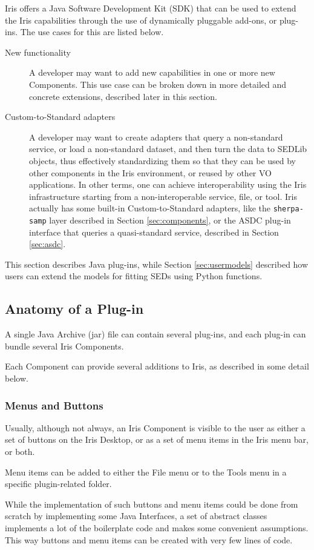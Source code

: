 \documentclass[preprint,authoryear,5p]{elsarticle}
\begin{document}
Iris offers a Java Software Development Kit (SDK) that can be used to extend the Iris
capabilities through the use of dynamically pluggable add-ons, or plug-ins.  The
use cases for this are listed below.
\begin{description} \item[New
functionality] A developer may want to add new capabilities in one or
more new Components. This use case can be broken down in more detailed and
concrete extensions, described later in this section.  \item[Custom-to-Standard
adapters] A developer may want to create adapters that query a non-standard
service, or load a non-standard dataset, and then turn the data to SEDLib
objects, thus effectively standardizing them so that they can be used by other
components in the Iris environment, or reused by other VO applications. In other
terms, one can achieve interoperability using the Iris infrastructure starting
from a non-interoperable service, file, or tool. Iris actually has some built-in
Custom-to-Standard adapters, like the \verb|sherpa-samp| layer described in Section
\ref{sec:components}, or the ASDC plug-in interface that queries a
quasi-standard service, described in Section \ref{sec:asdc}.  \end{description}

This section describes Java plug-ins, while Section \ref{sec:usermodels} described how
users can extend the models for fitting SEDs using Python functions.

\subsection{Anatomy of a Plug-in} A single Java Archive (jar) file can contain several
plug-ins, and each plug-in can bundle several Iris Components.

Each Component can provide several additions to Iris, as described in some
detail below.

\subsubsection{Menus and Buttons} Usually, although not always, an Iris
Component is visible to the user as either a set of buttons on the Iris Desktop,
or as a set of menu items in the Iris menu bar, or both.

Menu items can be added to either the File menu or to the Tools menu in a
specific plugin-related folder.

While the implementation of such buttons and menu items could be done from
scratch by implementing some Java Interfaces, a set of abstract classes
implements a lot of the boilerplate code and makes some convenient assumptions.
This way buttons and menu items can be created with very few lines of code.
\end{document}
